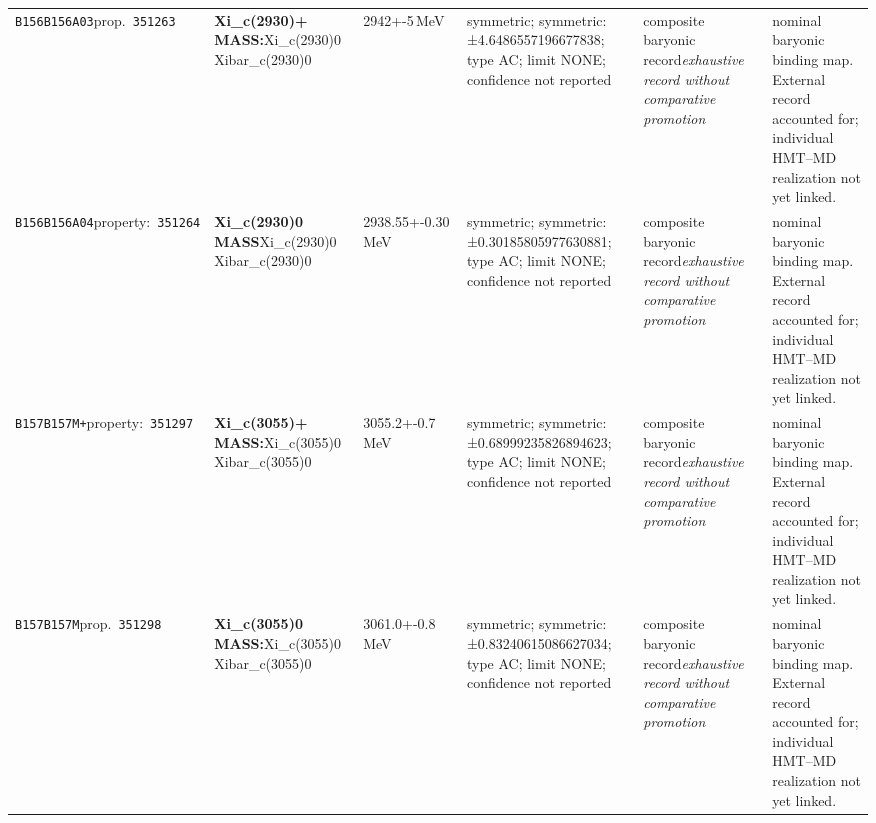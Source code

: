 \begin{landscape}
\begin{longtable}{L{1.85cm}L{4.45cm}L{2.35cm}L{4.05cm}L{3.35cm}L{7.15cm}}
\texttt{B156}\newline \texttt{B156A03}\newline prop.\ \texttt{351263} & \textbf{Xi\_\allowbreak{}c(2930)+ MASS:}\newline Xi\_\allowbreak{}c(2930)0 \textbar{}\allowbreak{} Xibar\_\allowbreak{}c(2930)0 & 2942+-5\,MeV & symmetric; symmetric: ±4.6486557196677838; type AC; limit NONE; confidence not reported & composite baryonic record\newline \emph{exhaustive record without comparative promotion} & nominal baryonic binding map. External record accounted for; individual HMT--MD realization not yet linked. \\
\texttt{B156}\newline \texttt{B156A04}\newline property:\ \texttt{351264} & \textbf{Xi\_\allowbreak{}c(2930)0 MASS}\newline Xi\_\allowbreak{}c(2930)0 \textbar{}\allowbreak{} Xibar\_\allowbreak{}c(2930)0 & 2938.55+-0.30\,MeV & symmetric; symmetric: ±0.30185805977630881; type AC; limit NONE; confidence not reported & composite baryonic record\newline \emph{exhaustive record without comparative promotion} & nominal baryonic binding map. External record accounted for; individual HMT--MD realization not yet linked. \\
\texttt{B157}\newline \texttt{B157M+}\newline property:\ \texttt{351297} & \textbf{Xi\_\allowbreak{}c(3055)+ MASS:}\newline Xi\_\allowbreak{}c(3055)0 \textbar{}\allowbreak{} Xibar\_\allowbreak{}c(3055)0 & 3055.2+-0.7\,MeV & symmetric; symmetric: ±0.68999235826894623; type AC; limit NONE; confidence not reported & composite baryonic record\newline \emph{exhaustive record without comparative promotion} & nominal baryonic binding map. External record accounted for; individual HMT--MD realization not yet linked. \\
\texttt{B157}\newline \texttt{B157M}\newline prop.\ \texttt{351298} & \textbf{Xi\_\allowbreak{}c(3055)0 MASS:}\newline Xi\_\allowbreak{}c(3055)0 \textbar{}\allowbreak{} Xibar\_\allowbreak{}c(3055)0 & 3061.0+-0.8\,MeV & symmetric; symmetric: ±0.83240615086627034; type AC; limit NONE; confidence not reported & composite baryonic record\newline \emph{exhaustive record without comparative promotion} & nominal baryonic binding map. External record accounted for; individual HMT--MD realization not yet linked. \\

\end{longtable}
\end{landscape}
